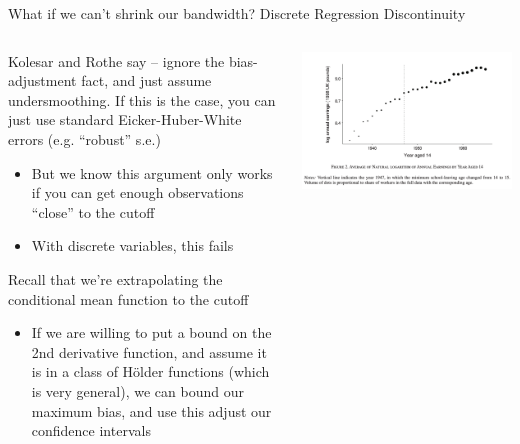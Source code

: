 \documentclass[notes,11pt, aspectratio=169]{beamer}
\newenvironment{wideitemize}{\itemize\addtolength{\itemsep}{10pt}}{\enditemize}
\begin{document}
\begin{frame}{What if we can't shrink our bandwidth? Discrete Regression Discontinuity}
    \begin{columns}[onlytextwidth, T] %
      \begin{column}{.6\textwidth}
        \begin{wideitemize}
        \item Kolesar and Rothe say -- ignore the bias-adjustment
          fact, and just assume undersmoothing. If this is the case,
          you can just use standard Eicker-Huber-White errors
          (e.g. ``robust'' s.e.)
          \begin{itemize}
          \item But we know this argument only works if you can get
            enough observations ``close'' to the cutoff
          \item With discrete variables, this fails
          \end{itemize}
        \item Recall that we're extrapolating the conditional mean function to the cutoff
          \begin{itemize}
          \item If we are willing to put a bound on the 2nd derivative
            function, and assume it is in a class of H\"older
            functions (which is very general), we can bound our
            maximum bias, and use this adjust our confidence intervals
          \end{itemize}
        \end{wideitemize}
      \end{column}%
      \hfill%
      \begin{column}{.4\textwidth}
        \includegraphics[width=\linewidth]{images/rdhonest_1.png}
      \end{column}%
    \end{columns}
\end{frame}
\end{document}
